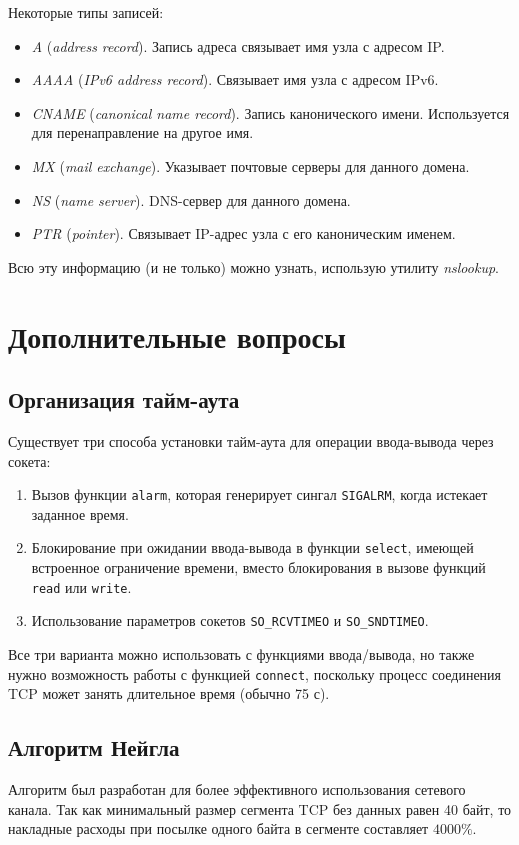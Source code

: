 Некоторые типы записей:
\begin{itemize}
  \item \emph{A} (\emph{address record}). Запись адреса связывает имя узла с адресом IP.
  \item \emph{AAAA} (\emph{IPv6 address record}). Связывает имя узла с адресом IPv6.
  \item \emph{CNAME} (\emph{canonical name record}). Запись канонического имени. Используется для перенаправление на другое имя.
  \item \emph{MX} (\emph{mail exchange}). Указывает почтовые серверы для данного домена.
  \item \emph{NS} (\emph{name server}). DNS-сервер для данного домена.
  \item \emph{PTR} (\emph{pointer}). Связывает IP-адрес узла с его каноническим именем.
\end{itemize}

Всю эту информацию (и не только) можно узнать, использую утилиту \emph{nslookup}.

\section{Дополнительные вопросы}
\label{sec:network-addition}

\subsection{Организация тайм-аута}
Существует три способа установки тайм-аута для операции ввода-вывода через сокета:
\begin{enumerate}
  \item Вызов функции \lstinline{alarm}, которая генерирует сингал \lstinline{SIGALRM}, когда истекает заданное время.
  \item Блокирование при ожидании ввода-вывода в функции \lstinline{select}, имеющей встроенное ограничение времени, вместо блокирования в вызове функций \lstinline{read} или \lstinline{write}.
  \item Использование параметров сокетов \lstinline{SO_RCVTIMEO} и \lstinline{SO_SNDTIMEO}.
\end{enumerate}

Все три варианта можно использовать с функциями ввода/вывода, но также нужно возможность работы с функцией \lstinline{connect}, поскольку процесс соединения TCP может занять длительное время (обычно 75 с).

\subsection{Алгоритм Нейгла}
\label{sec:nagle-algorithm}
Алгоритм был разработан для более эффективного использования сетевого канала. Так как минимальный размер сегмента TCP без данных равен 40 байт, то накладные расходы при посылке одного байта в сегменте составляет $4000\%$.

